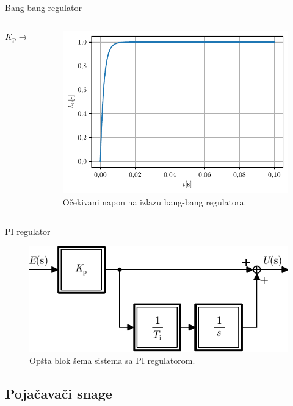 \documentclass[aspectratio=169,xcolor=dvipsnames]{beamer}
\begin{document}
\begin{frame}{Bang-bang regulator}
    
    
    \begin{columns}[c]
    \begin{column}{.25\textwidth}
    \centering
		\hfill    		 
    		 $K_{\rm p} \to \infty$   
    		 \hfill  
    \end{column}
    \begin{column}{.75\textwidth}
    \begin{figure}
    \includegraphics[width=0.7\linewidth]{fig/bbh.pdf}
    \caption{Očekivani napon na izlazu bang-bang regulatora.}
    \end{figure}
    \end{column}
\end{columns}
    
    
\end{frame}



\begin{frame}{PI regulator}
    \begin{figure}
    \includegraphics[width=0.6\linewidth]{fig/PIreg.pdf}
    \caption{Opšta blok šema sistema sa PI regulatorom.}
    \end{figure}
\end{frame}


\subsection{Pojačavači snage}
\end{document}
